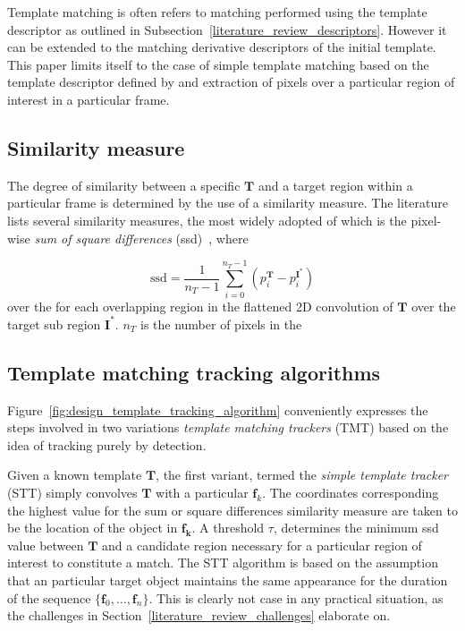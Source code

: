 Template matching is often refers to matching performed using the template
descriptor as outlined in Subsection~\ref{literature_review_descriptors}. However
it can be extended to the matching derivative descriptors of the initial
template.
This paper limits itself to the case of simple template matching based on the
template descriptor defined by and extraction of pixels over a particular region
of interest in a particular frame.

\subsection{Similarity measure}
The degree of similarity between a specific $\mathbf{T}$ and a target region
within a particular frame is determined by the use of a similarity
measure. The literature lists several similarity measures, the most widely
adopted of which is the pixel-wise \textit{sum of square differences}
(ssd)~\cite{Brunelli}, where

\[\text{ssd}=\frac{1}{n_T-1}\sum_{i=0}^{n_T-1}(p_{i}^{\mathbf{T}}-p_{i}^{\mathbf{I}^*}) \]
over the for each overlapping region in the flattened 2D convolution of $\mathbf{T}$ over the target
sub region $\mathbf{I}^*$. $n_T$ is the number of pixels in the 

\subsection{Template matching tracking algorithms}\label{theoretical_framework_tm_algorithms}
Figure~\ref{fig:design_template_tracking_algorithm} conveniently expresses the
steps involved in two variations \textit{template matching trackers} (TMT) based
on the idea of tracking purely by detection.

Given a known template $\mathbf{T}$, the first variant, termed the
\textit{simple template tracker} (STT) simply convolves $\mathbf{T}$ with a
particular $\mathbf{f}_k$. The coordinates corresponding the highest value for
the sum or square differences similarity measure are taken to be the location of the object
in $\mathbf{f_k}$. A threshold $\tau$, determines the minimum ssd value between
$\mathbf{T}$ and a candidate region necessary for a particular region of interest to
constitute a match.
The STT algorithm is based on the assumption that an particular target object
maintains the same appearance for the duration of the sequence
$\{\mathbf{f}_0,\ldots,\mathbf{f}_n\}$. This is clearly not case in any practical
situation, as the challenges in Section~\ref{literature_review_challenges}
elaborate on.

